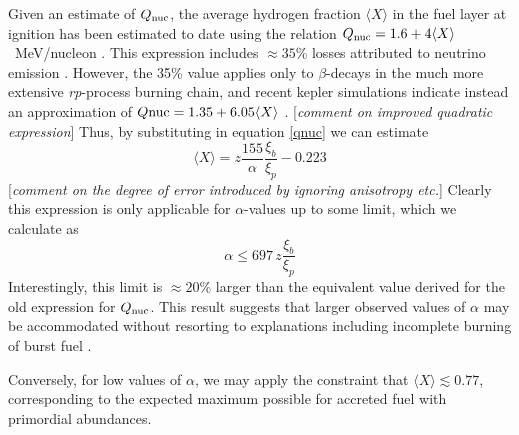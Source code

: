 \documentclass{aastex61}
\begin{document}
Given an estimate of $Q_{\rm nuc}$, the average hydrogen fraction $\langle X\rangle$ in the fuel layer at ignition has been estimated to date using the relation $Q_{\rm nuc}=1.6 + 4\langle X\rangle$~MeV/nucleon \cite[e.g.][and references therein]{gal03d}. This expression includes $\approx35$\% losses
attributed to neutrino emission \cite[]{fuji87}. However, the 35\% value applies only to $\beta$-decays in the much more extensive {\it rp}-process burning chain, and recent {\sc kepler} simulations indicate instead an approximation of 
$Q{\rm nuc}=1.35+6.05\langle X\rangle$ 
\cite[]{goodwin19a}.
[{\it comment on improved quadratic expression}]
%
Thus, by substituting in equation \ref{qnuc} we can estimate 
\begin{equation}
\langle X\rangle 
 = z\frac{155}{\alpha}\frac{\xi_b}{\xi_p} - 0.223 \label{xbar}
\end{equation}
[{\it comment on the degree of error introduced by ignoring anisotropy etc.}] 
%
Clearly this expression is only applicable for $\alpha$-values up to some limit, which we calculate as
\begin{equation}
\alpha \leq 697\, z \frac{\xi_b}{\xi_p}
\end{equation}
Interestingly, this limit is 
$\approx20$\%
%
larger than the equivalent value derived for the old expression for $Q_{\rm nuc}$. This result suggests that larger observed values of $\alpha$ may be accommodated without resorting to explanations including incomplete burning of burst fuel \cite[e.g.][]{bcatalog}.

Conversely, for low values of $\alpha$, we may apply the constraint that $\langle X\rangle \lesssim 0.77$, corresponding to the expected maximum possible for accreted fuel with primordial abundances.
\end{document}

